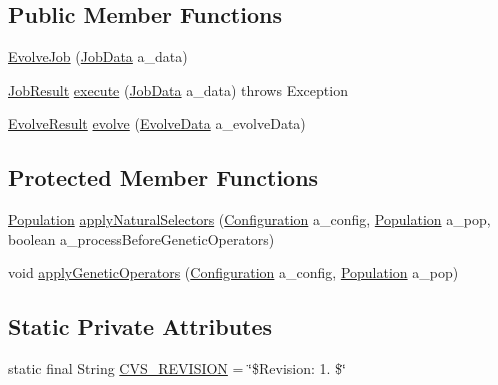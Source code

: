 \subsection*{Public Member Functions}
\begin{DoxyCompactItemize}
\item 
\hyperlink{classorg_1_1jgap_1_1impl_1_1job_1_1_evolve_job_aef7592d445a4c8b599c992579f9c80a1}{Evolve\-Job} (\hyperlink{classorg_1_1jgap_1_1impl_1_1job_1_1_job_data}{Job\-Data} a\-\_\-data)
\item 
\hyperlink{classorg_1_1jgap_1_1impl_1_1job_1_1_job_result}{Job\-Result} \hyperlink{classorg_1_1jgap_1_1impl_1_1job_1_1_evolve_job_a15941e3a369e59b86a5688181875204d}{execute} (\hyperlink{classorg_1_1jgap_1_1impl_1_1job_1_1_job_data}{Job\-Data} a\-\_\-data)  throws Exception 
\item 
\hyperlink{classorg_1_1jgap_1_1impl_1_1job_1_1_evolve_result}{Evolve\-Result} \hyperlink{classorg_1_1jgap_1_1impl_1_1job_1_1_evolve_job_aa6cd2a75875f3fef128ff9cc29bcb4f2}{evolve} (\hyperlink{classorg_1_1jgap_1_1impl_1_1job_1_1_evolve_data}{Evolve\-Data} a\-\_\-evolve\-Data)
\end{DoxyCompactItemize}
\subsection*{Protected Member Functions}
\begin{DoxyCompactItemize}
\item 
\hyperlink{classorg_1_1jgap_1_1_population}{Population} \hyperlink{classorg_1_1jgap_1_1impl_1_1job_1_1_evolve_job_a128b696a7adc919ae743ad7980b59927}{apply\-Natural\-Selectors} (\hyperlink{classorg_1_1jgap_1_1_configuration}{Configuration} a\-\_\-config, \hyperlink{classorg_1_1jgap_1_1_population}{Population} a\-\_\-pop, boolean a\-\_\-process\-Before\-Genetic\-Operators)
\item 
void \hyperlink{classorg_1_1jgap_1_1impl_1_1job_1_1_evolve_job_a39f8a447fa201c74de218cd06ca0c5bb}{apply\-Genetic\-Operators} (\hyperlink{classorg_1_1jgap_1_1_configuration}{Configuration} a\-\_\-config, \hyperlink{classorg_1_1jgap_1_1_population}{Population} a\-\_\-pop)
\end{DoxyCompactItemize}
\subsection*{Static Private Attributes}
\begin{DoxyCompactItemize}
\item 
static final String \hyperlink{classorg_1_1jgap_1_1impl_1_1job_1_1_evolve_job_a9aff9f20b1ed224f7f5513d6acc8495a}{C\-V\-S\-\_\-\-R\-E\-V\-I\-S\-I\-O\-N} = \char`\"{}\$Revision\-: 1. \$\char`\"{}
\end{DoxyCompactItemize}
